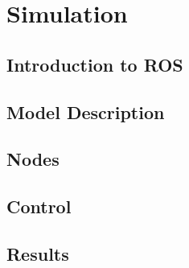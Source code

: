 \chapter{Simulation}
\label{sec:simulation}

\section{Introduction to ROS}
\section{Model Description}
\section{Nodes}
\section{Control}
\section{Results}